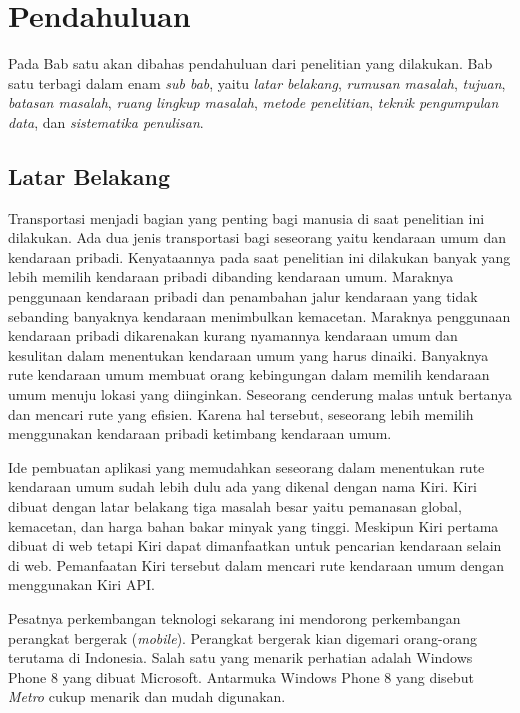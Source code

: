 \chapter{Pendahuluan}
\label{chap:intro}

Pada Bab satu akan dibahas pendahuluan dari penelitian yang dilakukan. Bab satu terbagi dalam enam \textit{sub bab}, yaitu \textit{latar belakang}, \textit{rumusan masalah}, \textit{tujuan}, \textit{batasan masalah}, \textit{ruang lingkup masalah}, \textit{metode penelitian}, \textit{teknik pengumpulan data}, dan \textit{sistematika penulisan}.

\section{Latar Belakang}
\label{sec:latar_belakang}
\hspace{0.5cm} Transportasi menjadi bagian yang penting bagi manusia di saat penelitian ini dilakukan. Ada dua jenis transportasi bagi seseorang yaitu kendaraan umum dan kendaraan pribadi. Kenyataannya pada saat penelitian ini dilakukan banyak yang lebih memilih kendaraan pribadi dibanding kendaraan umum. Maraknya penggunaan kendaraan pribadi dan penambahan jalur kendaraan yang tidak sebanding banyaknya kendaraan menimbulkan kemacetan. Maraknya penggunaan kendaraan pribadi dikarenakan kurang nyamannya kendaraan umum dan kesulitan dalam menentukan kendaraan umum yang harus dinaiki. Banyaknya rute kendaraan umum membuat orang kebingungan dalam memilih kendaraan umum menuju lokasi yang diinginkan. Seseorang cenderung malas untuk bertanya dan mencari rute yang efisien. Karena hal tersebut, seseorang lebih memilih menggunakan kendaraan pribadi ketimbang kendaraan umum. 

Ide pembuatan aplikasi yang memudahkan seseorang dalam menentukan rute kendaraan umum sudah lebih dulu ada yang dikenal dengan nama Kiri. Kiri dibuat dengan latar belakang tiga masalah besar yaitu pemanasan global, kemacetan, dan harga bahan bakar minyak yang tinggi\footnotemark[1]. Meskipun Kiri pertama dibuat di web tetapi Kiri dapat dimanfaatkan untuk pencarian kendaraan selain di web. Pemanfaatan Kiri tersebut dalam mencari rute kendaraan umum dengan menggunakan Kiri API.

Pesatnya perkembangan teknologi sekarang ini mendorong perkembangan perangkat bergerak (\textit{mobile}). Perangkat bergerak kian digemari orang-orang terutama di Indonesia. Salah satu yang menarik perhatian adalah Windows Phone 8 yang dibuat Microsoft. Antarmuka Windows Phone 8 yang disebut \textit{Metro} cukup menarik dan mudah digunakan. 

